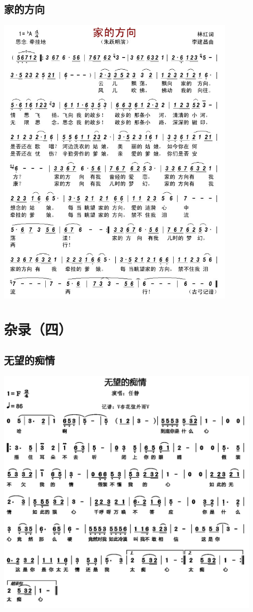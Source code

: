 \documentclass[cn,pad,twocol]{elegantbook}
\begin{document}
\section{家的方向}  \includegraphics[width=0.9\textwidth]{rpi400/20210130家的方向.jpg}

\chapter{杂录（四）}
\section{无望的痴情} \includegraphics[width=\textwidth]{rpi400/20210206无望的痴情.png}
\end{document}
